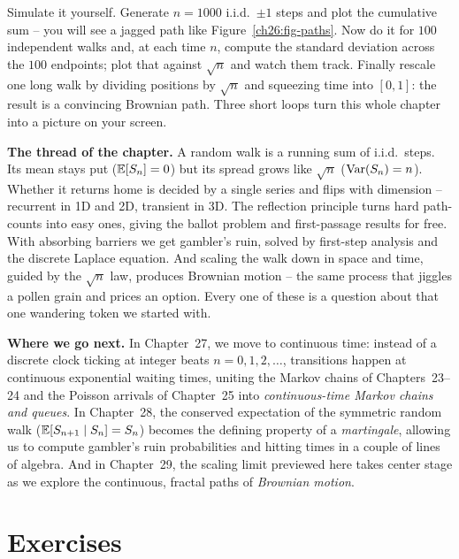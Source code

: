 \begin{labbox}
Simulate it yourself. Generate $n = 1000$ i.i.d.\ $\pm 1$ steps and plot the
cumulative sum -- you will see a jagged path like
Figure~\ref{ch26:fig-paths}. Now do it for $100$ independent walks and, at each
time $n$, compute the standard deviation across the $100$ endpoints; plot that
against $\sqrt{n}$ and watch them track. Finally rescale one long walk by
dividing positions by $\sqrt{n}$ and squeezing time into $[0,1]$: the result is
a convincing Brownian path. Three short loops turn this whole chapter into a
picture on your screen.
\end{labbox}

\begin{recoverybox}
\textbf{The thread of the chapter.} A random walk is a running sum of i.i.d.\
steps. Its mean stays put ($\operatorname{\mathbb{E}}[S_n] = 0$) but its spread grows like $\sqrt{n}$
($\operatorname{Var}(S_n) = n$). Whether it returns home is decided by a single series and
flips with dimension -- recurrent in 1D and 2D, transient in 3D. The reflection
principle turns hard path-counts into easy ones, giving the ballot problem and
first-passage results for free. With absorbing barriers we get gambler's ruin,
solved by first-step analysis and the discrete Laplace equation. And scaling
the walk down in space and time, guided by the $\sqrt{n}$ law, produces
Brownian motion -- the same process that jiggles a pollen grain and prices an
option. Every one of these is a question about that one wandering token we
started with.

\textbf{Where we go next.} In Chapter~27, we move to continuous time: instead of
a discrete clock ticking at integer beats $n = 0, 1, 2, \dots$, transitions
happen at continuous exponential waiting times, uniting the Markov chains of
Chapters~23--24 and the Poisson arrivals of Chapter~25 into
\emph{continuous-time Markov chains and queues}. In Chapter~28, the conserved
expectation of the symmetric random walk ($\operatorname{\mathbb{E}}[S_{n+1} \mid S_n] = S_n$) becomes
the defining property of a \emph{martingale}, allowing us to compute gambler's
ruin probabilities and hitting times in a couple of lines of algebra. And in Chapter~29, the
scaling limit previewed here takes center stage as we explore the continuous,
fractal paths of \emph{Brownian motion}.
\end{recoverybox}

\section{Exercises}
\label{ch26:exercises}

